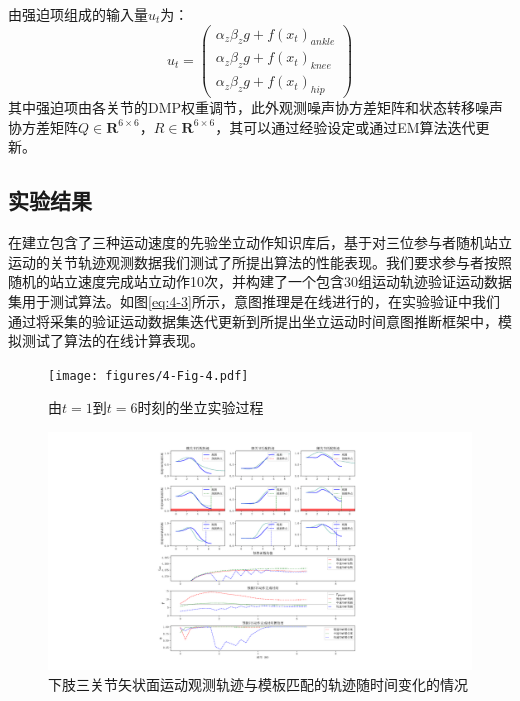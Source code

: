 由强迫项组成的输入量$u_t$为：
\begin{equation}
    u_t=\left(\begin{array}{l}
        \alpha_z \beta_z g+ f\left(x_t\right)_{ankle}\\
        \alpha_z \beta_z g+ f\left(x_t\right)_{knee}\\
        \alpha_z \beta_z g+ f\left(x_t\right)_{hip}
    \end{array}\right)
    \label{eq:4-43}
\end{equation}
其中强迫项由各关节的DMP权重调节，此外观测噪声协方差矩阵和状态转移噪声协方差矩阵$Q\in \mathbf{R}^{6 \times 6}$，$R\in \mathbf{R}^{6 \times 6}$，其可以通过经验设定或通过EM算法迭代更新\cite{bishopPatternRecognitionMachine2006}。

\subsection{实验结果} 
在建立包含了三种运动速度的先验坐立动作知识库后，基于对三位参与者随机站立运动的关节轨迹观测数据我们测试了所提出算法的性能表现。我们要求参与者按照随机的站立速度完成站立动作10次，并构建了一个包含30组运动轨迹验证运动数据集用于测试算法。如图\ref{eq:4-3}所示，意图推理是在线进行的，在实验验证中我们通过将采集的验证运动数据集迭代更新到所提出坐立运动时间意图推断框架中，模拟测试了算法的在线计算表现。
\begin{figure}[htb]
    \centering\texttt{[image: figures/4-Fig-4.pdf]}
    \caption{由$t=1$到$t=6$时刻的坐立实验过程}
    \label{fig:4-4}
\end{figure}

\begin{figure}[!t]
    \centering
    {
        \begin{minipage}{9.5in}
            \centering
            \includegraphics[width=\textwidth]{figures/4-Fig-5.pdf}
            \caption{下肢三关节矢状面运动观测轨迹与模板匹配的轨迹随时间变化的情况}
        \label{fig:4-5}
        \end{minipage}
    }
\end{figure}

